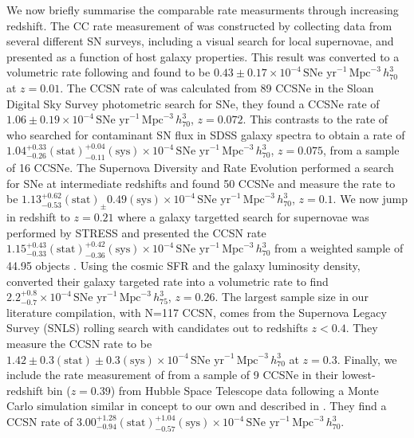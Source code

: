 \documentclass[a4paper,fleqn,usenatbib]{mnras}
\begin{document}
We now briefly summarise the comparable rate measurments through increasing redshift. The CC rate measurement of \citet{1999A&A...351..459C} was constructed by collecting data from several different SN surveys, including a visual search for local supernovae, and presented as a function of host galaxy properties. This result was converted to a volumetric rate following \citet{2008A&A...479...49B} and found to be $0.43\pm 0.17 \times10^{-4}\,\text{SNe yr}^{-1}\,\text{Mpc}^{-3}\, h_{70}^{3} $ at $z=0.01$. The CCSN rate of \citet{2014ApJ...792..135T} was calculated from 89 CCSNe in the Sloan Digital Sky Survey \citep[SDSS;][]{2000AJ....120.1579Y,2011AJ....142...72E} photometric search for SNe, they found a CCSNe rate of $1.06\pm 0.19 \times10^{-4}\,\text{SNe yr}^{-1}\,\text{Mpc}^{-3}\, h_{70}^{3} $, $z=0.072$. This contrasts to the rate of \citet{2015MNRAS.450..905G} who searched for contaminant SN flux in SDSS galaxy spectra to obtain a rate of $1.04_{-0.26}^{+0.33}\mathrm{(stat)}_{-0.11}^{+0.04}\mathrm{(sys)} \times10^{-4}\,\text{SNe yr}^{-1}\,\text{Mpc}^{-3}\, h_{70}^{3} $, $z=0.075$, from a sample of 16 CCSNe. The Supernova Diversity and Rate Evolution \citep[SUDARE;][]{2013Msngr.151...29B} performed a search for SNe at intermediate redshifts and found 50 CCSNe and measure the rate to be $1.13_{-0.53}^{+0.62}\mathrm{(stat)}_\pm 0.49\mathrm{(sys)} \times10^{-4}\,\text{SNe yr}^{-1}\,\text{Mpc}^{-3}\, h_{70}^{3} $, $z=0.1$. We now jump in redshift to $z=0.21$ where a galaxy targetted search for supernovae was performed by STRESS and presented the CCSN rate $1.15_{-0.33}^{+0.43}\mathrm{(stat)}_{-0.36}^{+0.42}\mathrm{(sys)} \times10^{-4}\,\text{SNe yr}^{-1}\,\text{Mpc}^{-3}\, h_{70}^{3} $ from a weighted sample of 44.95 objects \citep{2008A&A...479...49B}. Using the cosmic SFR and the galaxy luminosity density, \citet{2005A&A...430...83C} converted their galaxy targeted rate into a volumetric rate to find $2.2_{-0.7}^{+0.8} \times10^{-4}\,\text{SNe yr}^{-1}\,\text{Mpc}^{-3}\, h_{75}^{3} $, $z=0.26$. The largest sample size in our literature compilation, with N=117 CCSN, comes from the Supernova Legacy Survey (SNLS) \citep{2009A&A...499..653B} rolling search with candidates out to redshifts $z<0.4$. They measure the CCSN rate to be $1.42 \pm 0.3 \mathrm{(stat)} \pm 0.3 \mathrm{(sys)} \times10^{-4}\,\text{SNe yr}^{-1}\,\text{Mpc}^{-3}\, h_{70}^{3}$ at $z=0.3$. Finally, we include the rate measurement of \citet{2012ApJ...757...70D} from a sample of 9 CCSNe in their lowest-redshift bin ($z=0.39$) from Hubble Space Telescope data following a Monte Carlo simulation similar in concept to our own and described in \citet{2004ApJ...613..189D}. They find a CCSN rate of $3.00_{-0.94}^{+1.28}\mathrm{(stat)}_{-0.57}^{+1.04}\mathrm{(sys)} \times10^{-4}\,\text{SNe yr}^{-1}\,\text{Mpc}^{-3}\, h_{70}^{3} $.
\end{document}
